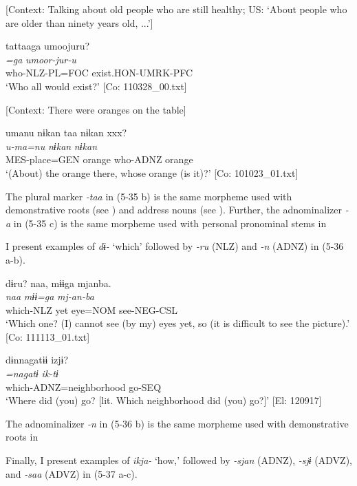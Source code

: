  \ex \label{ex:5:b} [Context: Talking about old people who are still healthy; US: ‘About people who are older than ninety years old, ...’]

\glll  tattaaga  umoojuru?\\
\textit{=ga}  \textit{umoor-jur-u}\\
who-NLZ-PL=FOC  exist.HON-UMRK-PFC\\
\glt ‘Who all would exist?’ [Co: 110328\_00.txt]

 \ex \label{ex:5:c} [Context: There were oranges on the table]

\glll  umanu  nɨkan  taa  nɨkan   xxx?\\
\textit{u-ma=nu}  \textit{nɨkan}  \textit{}  \textit{nɨkan}  \\
MES-place=GEN  orange  who-ADNZ  orange  \\
\glt ‘(About) the orange there, whose orange (is it)?’ [Co: 101023\_01.txt]
\z
\z

The plural marker \textit{-taa} in (5-35 b) is the same morpheme used with demonstrative roots (see ) and address nouns (see ). Further, the adnominalizer \textit{{}-a} in (5-35 c) is the same morpheme used with personal pronominal stems in 

  I present examples of \textit{dɨ-} ‘which’ followed by \textit{{}-ru} (NLZ) and \textit{{}-n} (ADNZ) in (5-36 a-b).

\ea \label{ex:5:36}  \ea \label{ex:5:a} %
\glll  dɨru?  naa,  mɨɨga  mjanba.\\
\textit{}  \textit{naa}  \textit{mɨɨ=ga}  \textit{mj-an-ba}\\
which-NLZ  yet  eye=NOM  see-NEG-CSL\\
\glt ‘Which one? (I) cannot see (by my) eyes yet, so (it is difficult to see the picture).’ [Co: 111113\_01.txt]

 \ex \label{ex:5:b} %
\glll  dɨnnagatɨɨ  izjɨ?\\
\textit{=nagatɨ}  \textit{ik-tɨ}\\
which-ADNZ=neighborhood  go-SEQ\\
\glt ‘Where did (you) go? [lit. Which neighborhood did (you) go?]’ [El: 120917]
\z
\z

The adnominalizer \textit{{}-n} in (5-36 b) is the same morpheme used with demonstrative roots in 

  Finally, I present examples of \textit{ikja-} ‘how,’ followed by \textit{{}-sjan} (ADNZ), \textit{{}-sjɨ} (ADVZ), and \textit{{}-saa} (ADVZ) in (5-37 a-c).

